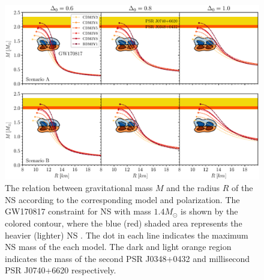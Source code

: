 \begin{figure}[ht!]
        \centering
        \includegraphics[width=\textwidth]{fig/MR.eps}
        \caption{The relation between gravitational mass $M$ and the radius $R$ of the \gls{NS} according to the corresponding model and polarization. The GW170817 constraint for \gls{NS} with mass $1.4M_\odot$ is shown by the colored contour, where the blue (red) shaded area represents the heavier (lighter) \gls{NS} \citep{abbott2018gw170817}. The dot in each line indicates the maximum \gls{NS} mass of the each model. The dark and light orange region indicates the mass of the second \gls{PSR} J0348+0432 \citep{antoniadis2013massive} and millisecond \gls{PSR} J0740+6620 \citep{cromartie2020relativistic} respectively.}
        \label{fig:mr}
\end{figure} 
